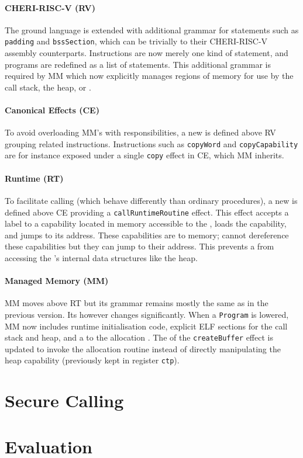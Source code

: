 \documentclass[main.tex]{subfiles}
\begin{document}
\paragraph{CHERI-RISC-V (RV)} The ground language is extended with additional grammar for statements such as \texttt{padding} and \texttt{bssSection}, which can be  trivially to their CHERI-RISC-V assembly counterparts. Instructions are now merely one kind of statement, and programs are redefined as a list of statements. This additional grammar is required by MM which now explicitly manages regions of memory for use by the call stack, the heap, or .

\paragraph{Canonical Effects (CE)} To avoid overloading MM's  with responsibilities, a new  is defined above RV grouping related instructions. Instructions such as \texttt{copyWord} and \texttt{copyCapability} are for instance exposed under a single \texttt{copy} effect in CE, which MM inherits.

\paragraph{Runtime (RT)} To facilitate calling  (which behave differently than ordinary procedures), a new  is defined above CE providing a \texttt{callRuntimeRoutine} effect. This effect accepts a label to a capability located in memory accessible to the , loads the capability, and jumps to its address. These capabilities are  to  memory;  cannot dereference these capabilities but they can jump to their address. This prevents a  from accessing the 's internal data structures like the heap.

\paragraph{Managed Memory (MM)} MM moves above RT but its grammar remains mostly the same as in the previous version. Its  however changes significantly. When a \texttt{Program} is lowered, MM now includes runtime initialisation code, explicit ELF sections for the call stack and heap, and a  to the allocation . The  of the \texttt{createBuffer} effect is updated to invoke the allocation routine instead of directly manipulating the heap capability (previously kept in register \texttt{ctp}).


\section{Secure Calling}

\section{Evaluation}

\biblio{}
\onlyinsubfile{\glsaddall\printglossaries}
\end{document}
